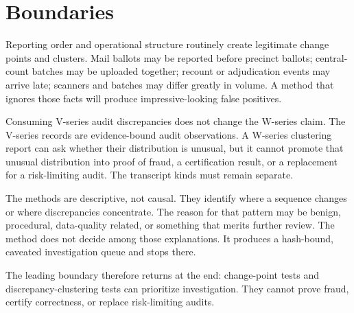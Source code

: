 \section{Boundaries}

Reporting order and operational structure routinely create legitimate change
points and clusters. Mail ballots may be reported before precinct ballots;
central-count batches may be uploaded together; recount or adjudication events
may arrive late; scanners and batches may differ greatly in volume. A method
that ignores those facts will produce impressive-looking false positives.

Consuming V-series audit discrepancies does not change the W-series claim. The
V-series records are evidence-bound audit observations. A W-series clustering
report can ask whether their distribution is unusual, but it cannot promote
that unusual distribution into proof of fraud, a certification result, or a
replacement for a risk-limiting audit. The transcript kinds must remain
separate.

The methods are descriptive, not causal. They identify where a sequence changes
or where discrepancies concentrate. The reason for that pattern may be benign,
procedural, data-quality related, or something that merits further review. The
method does not decide among those explanations. It produces a hash-bound,
caveated investigation queue and stops there.

The leading boundary therefore returns at the end: change-point tests and
discrepancy-clustering tests can prioritize investigation. They cannot prove
fraud, certify correctness, or replace risk-limiting audits.
